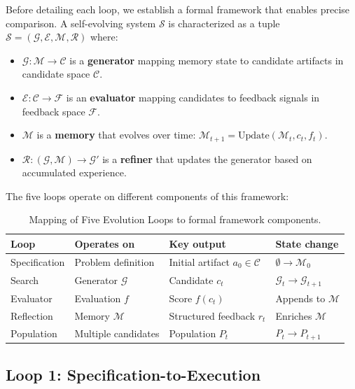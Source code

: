 Before detailing each loop, we establish a formal framework that enables precise comparison. A self-evolving system $\mathcal{S}$ is characterized as a tuple $\mathcal{S} = (\mathcal{G}, \mathcal{E}, \mathcal{M}, \mathcal{R})$ where:

\begin{itemize}
    \item $\mathcal{G}: \mathcal{M} \rightarrow \mathcal{C}$ is a \textbf{generator} mapping memory state to candidate artifacts in candidate space $\mathcal{C}$.
    \item $\mathcal{E}: \mathcal{C} \rightarrow \mathcal{F}$ is an \textbf{evaluator} mapping candidates to feedback signals in feedback space $\mathcal{F}$.
    \item $\mathcal{M}$ is a \textbf{memory} that evolves over time: $\mathcal{M}_{t+1} = \text{Update}(\mathcal{M}_t, c_t, f_t)$.
    \item $\mathcal{R}: (\mathcal{G}, \mathcal{M}) \rightarrow \mathcal{G}'$ is a \textbf{refiner} that updates the generator based on accumulated experience.
\end{itemize}

The five loops operate on different components of this framework:

\begin{table}[t]
\centering
\small
\caption{Mapping of Five Evolution Loops to formal framework components.}
\label{tab:loop_components}
\begin{tabular}{@{}llll@{}}
\toprule
\textbf{Loop} & \textbf{Operates on} & \textbf{Key output} & \textbf{State change} \\
\midrule
Specification & Problem definition & Initial artifact $a_0 \in \mathcal{C}$ & $\emptyset \rightarrow \mathcal{M}_0$ \\
Search & Generator $\mathcal{G}$ & Candidate $c_t$ & $\mathcal{G}_t \rightarrow \mathcal{G}_{t+1}$ \\
Evaluator & Evaluation $f$ & Score $f(c_t)$ & Appends to $\mathcal{M}$ \\
Reflection & Memory $\mathcal{M}$ & Structured feedback $r_t$ & Enriches $\mathcal{M}$ \\
Population & Multiple candidates & Population $P_t$ & $P_t \rightarrow P_{t+1}$ \\
\bottomrule
\end{tabular}
\end{table}


\subsection{Loop 1: Specification-to-Execution}
\label{sec:spec-loop}

